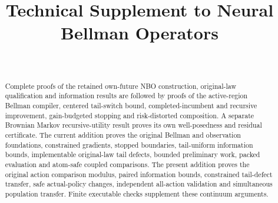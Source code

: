 \documentclass[ecta,nameyear,draft]{econsocart}
\begin{document}
\begin{frontmatter}
\title{Technical Supplement to Neural Bellman Operators}
\begin{aug}
\author[id=au1,addressref={add1}]{~}
\address[id=add1]{Peking University}
\end{aug}
\begin{abstract}Complete proofs of the retained own-future NBO construction, original-law qualification and information results are followed by proofs of the active-region Bellman compiler, centered tail-switch bound, completed-incumbent and recursive improvement, gain-budgeted stopping and risk-distorted composition. A separate Brownian Markov recursive-utility result proves its own well-posedness and residual certificate. The current addition proves the original Bellman and observation foundations, constrained gradients, stopped boundaries, tail-uniform information bounds, implementable original-law tail defects, bounded preliminary work, packed evaluation and atom-safe coupled comparisons. The present addition proves the original action comparison modulus, paired information bounds, constrained tail-defect transfer, safe actual-policy changes, independent all-action validation and simultaneous population transfer. Finite executable checks supplement these continuum arguments.\end{abstract}
\end{frontmatter}





















\end{document}
